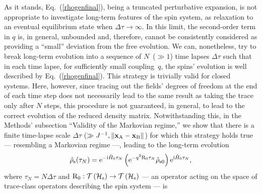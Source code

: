 \documentclass[]{nature}
\begin{document}
As it stands, Eq.~(\ref{rhogenfinal}), being a truncated perturbative expansion, 
is not appropriate to investigate long-term features of the spin system,
as relaxation to an eventual equilibrium state when $\Delta \tau \to \infty$. In this limit,
the second-order term in $q$ is, in general, unbounded and, therefore, cannot be consistently considered as providing
a ``small'' deviation from the free evolution. We can, nonetheless, try to break long-term evolution 
into a sequence 
of $N$~($\gg 1$) time lapses $\Delta \tau$ such that in each time lapse, for sufficiently small coupling~$q$, 
the spins' evolution is
well described by Eq.~(\ref{rhogenfinal}). 
This strategy is trivially valid for closed systems. Here, however, since
tracing out the fields' degrees of freedom at the end of  each  time step does not necessarily lead to the same
result as taking the trace only after $N$ steps,  this procedure is not guaranteed, in general, to lead to the correct evolution of the reduced density matrix.
Notwithstanding this, 
in the Methods' subsection ``Validity of the Markovian regime,'' we show that there is a finite time-lapse scale $\Delta \tau$ ($ \gg J^{-1},\|{\bf x}_{\rm A}-{\bf x}_{\rm B}\|$)
for which this strategy holds true --- resembling a Markovian regime ---, leading to the long-term evolution
\begin{eqnarray}
\hat\rho_{\rm s}(\tau_N) 
= {\rm e}^{-{\rm i} \hat H_0 \tau_N }\left({\rm e}^{-q^2{\rm R}_0 \tau_N}\hat\rho_{\rm s0}\right){\rm e}^{{\rm i} \hat H_0 \tau_N},
\label{evolfinal}
\end{eqnarray}
where $\tau_N = N\Delta\tau$ 
and ${\rm R}_0:{\cal T}\left({\cal H}_{\rm s}\right)\to {\cal T}\left({\cal H}_{\rm s}\right)$  --- 
an operator acting on the space of trace-class operators describing the spin system --- is
\end{document}
